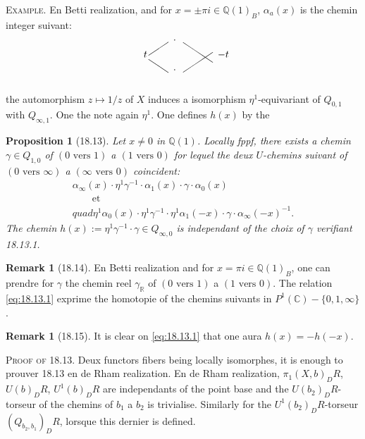 \documentclass[12pt,a4paper]{article}
\theoremstyle{plain}
\newtheorem{proposition}[theorem]{Proposition}
\theoremstyle{definition}
\newtheorem{remark}[theorem]{Remark}
\theoremstyle{remark}
\newcommand{\Betti}{B}
\newcommand{\dR}{DR}
\newcommand{\QQ}{\mathbb{Q}}
\newcommand{\CC}{\mathbb{C}}
\newcommand{\RR}{\mathbb{R}}
\begin{document}
\noindent \textsc{Example.} En Betti realization, and for
$x = \pm \pi i \in \QQ(1)_\Betti$, $\alpha_a(x)$ is the chemin integer
suivant:
\[
\begin{picture}(100,40)
\put(10,20){$t$}
\put(40,35){$\cdot$}
\put(40,5){$\cdot$}
\put(85,20){$-t$}
\put(15,22){$\line(3,2){20}$}
\put(15,18){$\line(3,-2){20}$}
\put(50,35){$\line(3,-2){30}$}
\put(50,5){$\line(3,2){30}$}
\end{picture}
\]

the automorphism $z \mapsto 1/z$ of $X$ induces a isomorphism
$\eta^1$-equivariant of $Q_{0,1}$ with $Q_{\infty,1}$. One the note
again $\eta^1$. One defines $h(x)$ by the

\begin{proposition}[18.13]\label{prop:18.13}
Let $x \neq 0$ in $\QQ(1)$. Locally fppf, there exists a chemin
$\gamma \in Q_{1,0}$ of $(0 \text{ vers } 1)$ a $(1 \text{ vers } 0)$
for lequel the deux $U$-chemins suivant of $(0 \text{ vers }
\infty)$ a $(\infty \text{ vers } 0)$ coincident:
\begin{multline}\label{eq:18.13.1}
\alpha_\infty(x) \cdot \eta^1 \gamma^{-1} \cdot \alpha_1(x)
\cdot \gamma \cdot \alpha_0(x) \\
\qquad \text{et} \\quad
\eta^1 \alpha_0(x) \cdot \eta^1 \gamma^{-1} \cdot \eta^1
\alpha_1(-x) \cdot \gamma \cdot \alpha_\infty(-x)^{-1}.
\end{multline}
The chemin $h(x) := \eta^1 \gamma^{-1} \cdot \gamma \in
Q_{\infty,0}$ is independant of the choix of $\gamma$ verifiant
18.13.1.
\end{proposition}

\begin{remark}[18.14]\label{rem:18.14}
En Betti realization and for $x = \pi i \in \QQ(1)_\Betti$, one can prendre for $\gamma$ the chemin reel $\gamma_\RR$ of $(0
\text{ vers } 1)$ a $(1 \text{ vers } 0)$. The relation
\eqref{eq:18.13.1} exprime the homotopie of the chemins suivants in
$P^1(\CC) - \{0,1,\infty\}$.
\end{remark}

\begin{remark}[18.15]\label{rem:18.15}
It is clear on \eqref{eq:18.13.1} that one aura $h(x) = -h(-x)$.
\end{remark}

\noindent \textsc{Proof of 18.13.} Deux functors fibers being
locally isomorphes, it is enough to prouver 18.13 en de Rham realization. En de Rham realization, $\pi_1(X,b)_\dR$, $U(b)_\dR$,
$U^1(b)_\dR$ are independants of the point base and the
$U(b_2)_\dR$-torseur of the chemins of $b_1$ a $b_2$ is trivialise. Similarly for the $U^1(b_2)_\dR$-torseur $(Q_{b_2,b_1})_\dR$, lorsque this
dernier is defined.
\end{document}
